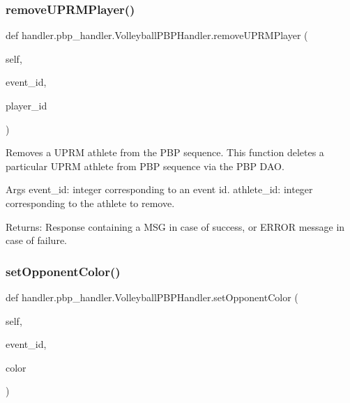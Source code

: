 \subsubsection{\texorpdfstring{remove\+U\+P\+R\+M\+Player()}{removeUPRMPlayer()}}
{\footnotesize\ttfamily def handler.\+pbp\+\_\+handler.\+Volleyball\+P\+B\+P\+Handler.\+remove\+U\+P\+R\+M\+Player (\begin{DoxyParamCaption}\item[{}]{self,  }\item[{}]{event\+\_\+id,  }\item[{}]{player\+\_\+id }\end{DoxyParamCaption})}

\begin{DoxyVerb}Removes a UPRM athlete from the PBP sequence.
This function deletes a particular UPRM athlete from PBP sequence via the PBP DAO.

Args
    event_id: integer corresponding to an event id.
    athlete_id: integer corresponding to the athlete to remove.

Returns:
    Response containing a MSG in case of success, or ERROR message in case of failure.
\end{DoxyVerb}
 \mbox{\label{classhandler_1_1pbp__handler_1_1_volleyball_p_b_p_handler_a001188443e41ef56a85e3ca54e51869c}} 
\subsubsection{\texorpdfstring{set\+Opponent\+Color()}{setOpponentColor()}}
{\footnotesize\ttfamily def handler.\+pbp\+\_\+handler.\+Volleyball\+P\+B\+P\+Handler.\+set\+Opponent\+Color (\begin{DoxyParamCaption}\item[{}]{self,  }\item[{}]{event\+\_\+id,  }\item[{}]{color }\end{DoxyParamCaption})}

